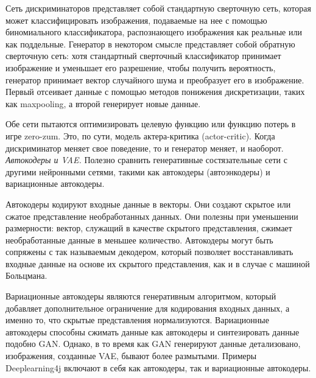 \documentclass{article}
\begin{document}
Сеть дискриминаторов представляет собой стандартную сверточную сеть, которая может классифицировать изображения, подаваемые на нее с помощью биномиального классификатора, распознающего изображения как реальные или как поддельные. Генератор в некотором смысле представляет собой обратную сверточную сеть: хотя стандартный сверточный классификатор принимает изображение и уменьшает его разрешение, чтобы получить вероятность, генератор принимает вектор случайного шума и преобразует его в изображение. Первый отсеивает данные с помощью методов понижения дискретизации, таких как maxpooling, а второй генерирует новые данные.

Обе сети пытаются оптимизировать целевую функцию или функцию потерь в игре zero-zum. Это, по сути, модель актера-критика (actor-critic). Когда дискриминатор меняет свое поведение, то и генератор меняет, и наоборот. \\

\textit{Автокодеры и VAE. }Полезно сравнить генеративные состязательные сети с другими нейронными сетями, такими как автокодеры (автоэнкодеры) и вариационные автокодеры.

Автокодеры кодируют входные данные в векторы. Они создают скрытое или сжатое представление необработанных данных. Они полезны при уменьшении размерности: вектор, служащий в качестве скрытого представления, сжимает необработанные данные в меньшее количество. Автокодеры могут быть сопряжены с так называемым декодером, который позволяет восстанавливать входные данные на основе их скрытого представления, как и в случае с машиной Больцмана.

Вариационные автокодеры являются генеративным алгоритмом, который добавляет дополнительное ограничение для кодирования входных данных, а именно то, что скрытые представления нормализуются. Вариационные автокодеры способны сжимать данные как автокодеры и синтезировать данные подобно GAN. Однако, в то время как GAN генерируют данные детализовано, изображения, созданные VAE, бывают более размытыми. Примеры Deeplearning4j включают в себя как автокодеры, так и вариационные автокодеры.
\end{document}
